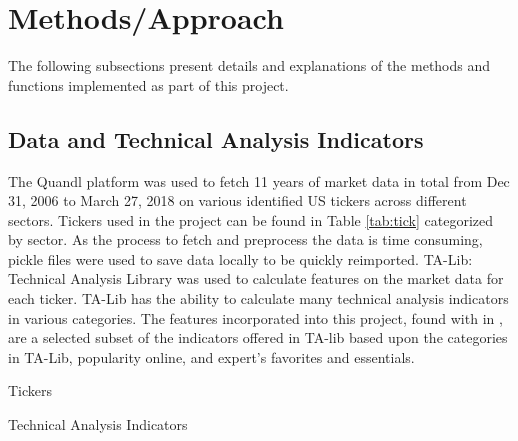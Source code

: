 \documentclass{article}\raggedbottom
\begin{document}
\section{Methods/Approach}
The following subsections present details and explanations of the methods and functions implemented as part of this project.

\subsection{Data and Technical Analysis Indicators}
The Quandl platform was used to fetch 11 years of market data in total from Dec 31, 2006 to March 27, 2018 on various identified US tickers across different sectors. Tickers used in the project can be found in Table \ref{tab:tick} categorized by sector. As the process to fetch and preprocess the data is time consuming, pickle files were used to save data locally to be quickly reimported. TA-Lib: Technical Analysis Library was used to calculate features on the market data for each ticker. TA-Lib has the ability to calculate many technical analysis indicators in various categories. The features incorporated into this project, found with in , are a selected subset of the indicators offered in TA-lib based upon the categories in TA-Lib, popularity online, and expert's favorites and essentials.

\begin{table}[h]
	\centering
	\caption{Tickers}
	\label{tab:tick}
\end{table}

\begin{table}[h]
	\caption{Technical Analysis Indicators}
	\label{tab:inds}
\end{table}
\end{document}
